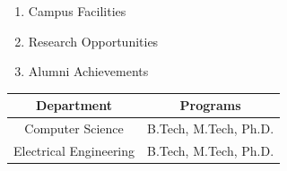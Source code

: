 \documentclass{article}
\begin{document}
\begin{enumerate}
    \item Campus Facilities
    \item Research Opportunities
    \item Alumni Achievements
\end{enumerate}

\begin{tabular}{|c|c|}
\hline
Department & Programs \\
\hline
Computer Science & B.Tech, M.Tech, Ph.D. \\
Electrical Engineering & B.Tech, M.Tech, Ph.D. \\
\hline
\end{tabular}
\end{document}
